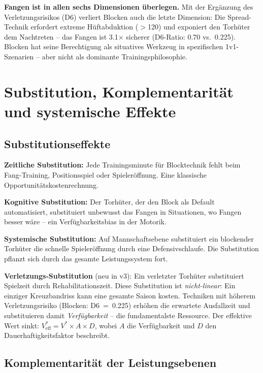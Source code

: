 \documentclass[12pt,a4paper]{article}
\begin{document}
\textbf{Fangen ist in allen sechs Dimensionen \"uberlegen.} Mit der Erg\"anzung des Verletzungsrisikos (D6) verliert Blocken auch die letzte Dimension: Die Spread-Technik erfordert extreme H\"uftabduktion ($>$120\textdegree{}) und exponiert den Torh\"uter dem Nachtreten -- das Fangen ist 3.1$\times$ sicherer (D6-Ratio: 0.70 vs.\ 0.225). Blocken hat seine Berechtigung als situatives Werkzeug in spezifischen 1v1-Szenarien -- aber nicht als dominante Trainingsphilosophie.


\section{Substitution, Komplementarit\"at und systemische Effekte}
\label{sec:komplementaritaet}

\subsection{Substitutionseffekte}
\label{sec:substitution}

\textbf{Zeitliche Substitution:} Jede Trainingsminute f\"ur Blocktechnik fehlt beim Fang-Training, Positionsspiel oder Spieler\"offnung. Eine klassische Opportunit\"atskostenrechnung.

\textbf{Kognitive Substitution:} Der Torh\"uter, der den Block als Default automatisiert, substituiert unbewusst das Fangen in Situationen, wo Fangen besser w\"are -- ein Verf\"ugbarkeitsbias in der Motorik.

\textbf{Systemische Substitution:} Auf Mannschaftsebene substituiert ein blockender Torh\"uter die schnelle Spieler\"offnung durch eine Defensivschlaufe. Die Substitution pflanzt sich durch das gesamte Leistungssystem fort.

\textbf{Verletzungs-Substitution} (neu in v3): Ein verletzter Torh\"uter substituiert Spielzeit durch Rehabilitationszeit. Diese Substitution ist \emph{nicht-linear}: Ein einziger Kreuzbandriss kann eine gesamte Saison kosten. Techniken mit h\"oherem Verletzungsrisiko (Blocken: D6~=~0.225) erh\"ohen die erwartete Ausfallzeit und substituieren damit \emph{Verf\"ugbarkeit} -- die fundamentalste Ressource. Der effektive Wert sinkt: $V^{*}_{\text{eff}} = V^{*} \times A \times D$, wobei $A$ die Verf\"ugbarkeit und $D$ den Dauerhaftigkeitsfaktor beschreibt.


\subsection{Komplementarit\"at der Leistungsebenen}
\label{sec:komplement}
\end{document}
